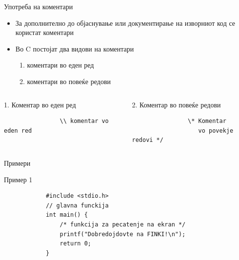 \begin{frame}[fragile]{Употреба на коментари}
	\begin{itemize}
		\item За дополнително до објаснување или документирање на изворниот код се користат коментари
		\item Во C постојат два видови на коментари
		\begin{enumerate}
			\item коментари во еден ред
			\item коментари во повеќе редови
		\end{enumerate}	
		
	\end{itemize}
		
	\begin{columns}[t]
			\begin{block}{1. Коментар во еден ред}
				\begin{verbatim}
				\\ komentar vo eden red
				\end{verbatim}
			\end{block}
			\begin{block}{2. Коментар во повеќе редови}
				\begin{verbatim}
				\* Komentar 
				   vo povekje redovi */
				\end{verbatim}
			\end{block}
	\end{columns}		

\end{frame}

\begin{frame}[fragile]{Примери}
	\begin{exampleblock}{Пример 1}
		\begin{lstlisting}
			#include <stdio.h>
			// glavna funckija
			int main() {
			    /* funkcija za pecatenje na ekran */
			    printf("Dobredojdovte na FINKI!\n");
			    return 0;
			}
		\end{lstlisting}
	\end{exampleblock}
\end{frame}


